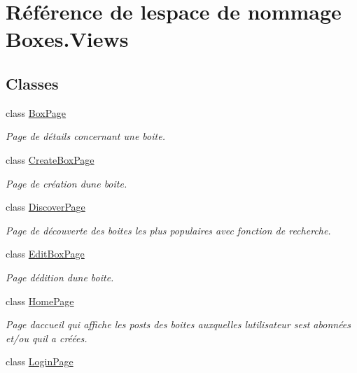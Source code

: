 \hypertarget{namespace_boxes_1_1_views}{}\section{Référence de l\textquotesingle{}espace de nommage Boxes.\+Views}
\label{namespace_boxes_1_1_views}
\subsection*{Classes}
\begin{DoxyCompactItemize}
\item 
class \hyperlink{class_boxes_1_1_views_1_1_box_page}{Box\+Page}
\begin{DoxyCompactList}\small\item\em Page de détails concernant une boite. \end{DoxyCompactList}\item 
class \hyperlink{class_boxes_1_1_views_1_1_create_box_page}{Create\+Box\+Page}
\begin{DoxyCompactList}\small\item\em Page de création d\textquotesingle{}une boite. \end{DoxyCompactList}\item 
class \hyperlink{class_boxes_1_1_views_1_1_discover_page}{Discover\+Page}
\begin{DoxyCompactList}\small\item\em Page de découverte des boites les plus populaires avec fonction de recherche. \end{DoxyCompactList}\item 
class \hyperlink{class_boxes_1_1_views_1_1_edit_box_page}{Edit\+Box\+Page}
\begin{DoxyCompactList}\small\item\em Page d\textquotesingle{}édition d\textquotesingle{}une boite. \end{DoxyCompactList}\item 
class \hyperlink{class_boxes_1_1_views_1_1_home_page}{Home\+Page}
\begin{DoxyCompactList}\small\item\em Page d\textquotesingle{}accueil qui affiche les posts des boites auxquelles l\textquotesingle{}utilisateur s\textquotesingle{}est abonnées et/ou qu\textquotesingle{}il a créées. \end{DoxyCompactList}\item 
class \hyperlink{class_boxes_1_1_views_1_1_login_page}{Login\+Page}

\end{DoxyCompactItemize}

